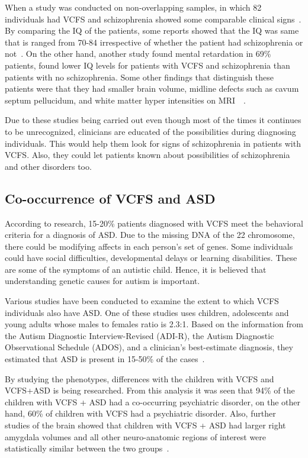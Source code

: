 When a study was conducted on non-overlapping samples, in which 82 individuals had VCFS and schizophrenia showed some comparable clinical signs~\cite{bassett2008schizophrenia}. By comparing the IQ of the patients, some reports showed that the IQ was same that is ranged from 70-84 irrespective of whether the patient had schizophrenia or not~\cite{chow2006neurocognitive}. On the other hand, another study found mental retardation in 69\% patients, found lower IQ levels for patients with VCFS and schizophrenia than patients with no schizophrenia\cite{raux2006involvement}. Some other findings that distinguish these patients were that they had smaller brain volume, midline defects such as cavum septum pellucidum, and white matter hyper intensities on MRI~\cite{van2004brain}~\cite{chow1999qualitative}. 

Due to these studies being carried out even though most of the times it continues to be unrecognized, clinicians are educated of the possibilities during diagnosing individuals. This would help them look for signs of schizophrenia in patients with VCFS. Also, they could let patients known about possibilities of schizophrenia and other disorders too.
\subsection{Co-occurrence of VCFS and ASD}
According to research, 15-20\% patients diagnosed with VCFS meet the behavioral criteria for a diagnosis of ASD. Due to the missing DNA of the 22 chromosome,  there could be modifying affects in each person’s set of genes. Some individuals could have social difficulties, developmental delays or learning disabilities. These are some of the symptoms of an autistic child. Hence, it is believed that understanding genetic causes for autism is important.

Various studies have been conducted to examine the extent to which VCFS individuals also have ASD. One of these studies uses children, adolescents and young adults whose males to females ratio is 2.3:1. Based on the information from the Autism Diagnostic Interview-Revised (ADI-R), the Autism Diagnostic Observational Schedule (ADOS), and a clinician’s best-estimate diagnosis, they estimated that ASD is present in 15-50\% of the cases~\cite{ousley2017examining}.

By studying the phenotypes, differences with the children with VCFS and VCFS+ASD is being researched. From this analysis it was seen that 94\% of the children with VCFS + ASD had a co-occurring psychiatric disorder, on the other hand, 60\% of children with VCFS had a psychiatric disorder. Also, further studies of the brain showed that children with VCFS + ASD had larger right amygdala volumes and all other neuro-anatomic regions of interest were statistically similar between the two groups~\cite{antshel2007autistic}.

